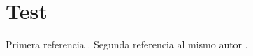 \documentclass{ui1activity}
\begin{document}
\section{Test}
Primera referencia \autocite[pp.~102-103]{garcia2021}.
Segunda referencia al mismo autor \autocite[pp.~45]{garcia2021}.
\makebibliography
\end{document}
